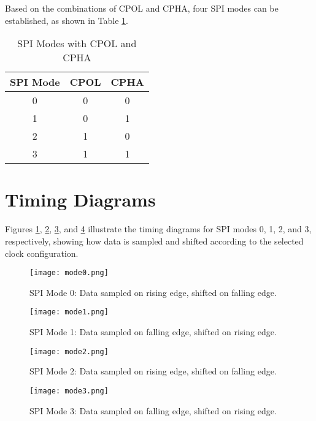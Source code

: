 \documentclass{article}
\begin{document}
Based on the combinations of CPOL and CPHA, four SPI modes can be established, as shown in Table \ref{tab:spi_modes}.

\begin{table}[h]
    \centering
    \caption{SPI Modes with CPOL and CPHA}
    \begin{tabular}{@{}ccc@{}}
        \toprule
        \textbf{SPI Mode} & \textbf{CPOL} & \textbf{CPHA} \\ \midrule
        0                  & 0             & 0             \\
        1                  & 0             & 1             \\
        2                  & 1             & 0             \\
        3                  & 1             & 1             \\ \bottomrule
    \end{tabular}
    \label{tab:spi_modes}
\end{table}

\section{Timing Diagrams}
Figures \ref{fig:mode0}, \ref{fig:mode1}, \ref{fig:mode2}, and \ref{fig:mode3} illustrate the timing diagrams for SPI modes 0, 1, 2, and 3, respectively, showing how data is sampled and shifted according to the selected clock configuration.

\begin{figure}[h]
    \centering
    \texttt{[image: mode0.png]}
    \caption{SPI Mode 0: Data sampled on rising edge, shifted on falling edge.}
    \label{fig:mode0}
\end{figure}

\begin{figure}[h]
    \centering
    \texttt{[image: mode1.png]}
    \caption{SPI Mode 1: Data sampled on falling edge, shifted on rising edge.}
    \label{fig:mode1}
\end{figure}

\begin{figure}[h]
    \centering
    \texttt{[image: mode2.png]}
    \caption{SPI Mode 2: Data sampled on rising edge, shifted on falling edge.}
    \label{fig:mode2}
\end{figure}

\begin{figure}[h]
    \centering
    \texttt{[image: mode3.png]}
    \caption{SPI Mode 3: Data sampled on falling edge, shifted on rising edge.}
    \label{fig:mode3}
\end{figure}
\end{document}
